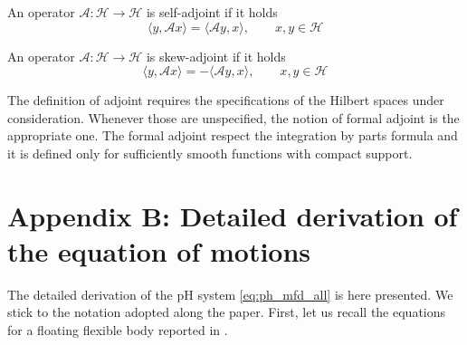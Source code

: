 \documentclass{svjour3}                     %
\begin{document}
\begin{definition}
An operator $\mathcal{A}: \mathscr{H} \rightarrow \mathscr{H}$ is self-adjoint if it holds
\begin{equation}
\langle y, \mathcal{A}x \rangle = \langle \mathcal{A} y, x \rangle, \qquad x, y \in \mathscr{H}
\end{equation}
\end{definition}
\begin{definition}
	An operator $\mathcal{A}: \mathscr{H} \rightarrow \mathscr{H}$ is  skew-adjoint if it holds
	\begin{equation}
	\langle y, \mathcal{A}x \rangle = -\langle \mathcal{A} y, x \rangle, \qquad x, y \in \mathscr{H}
	\end{equation}	
\end{definition}
The definition of adjoint requires the specifications of the Hilbert spaces under consideration. Whenever those are unspecified, the notion of formal adjoint is the appropriate one. The formal adjoint respect the integration by parts formula and it is defined only for sufficiently smooth functions with compact support. 

 
\section*{Appendix B: Detailed derivation of the equation of motions}

The detailed derivation of the pH system \eqref{eq:ph_mfd_all} is here presented. We stick to the notation adopted along the paper. First, let us recall the equations for a floating flexible body reported in \cite{MB_Daepde,simeon2013computational}.
\end{document}
